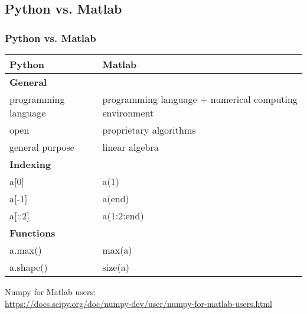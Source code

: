 \subsection{Python vs. Matlab}

\begin{frame}[fragile]
\frametitle{Python vs. Matlab}
\footnotesize

\begin{table}
\scriptsize
\begin{tabular}{p{}p{}}
\toprule
Python  	  				& Matlab\\
\midrule
\textbf{General}			& \\
programming language		& programming language + numerical computing environment\\
open						& proprietary algorithms\\
general purpose				& linear algebra\\
\midrule
\textbf{Indexing} 			& 	\\
a[0]						& a(1) \\
a[-1]						& a(end)\\
a[::2]						& a(1:2:end)\\
\midrule
\textbf{Functions}			& \\
a.max()						& max(a)\\
a.shape()					& size(a)\\
\bottomrule
\end{tabular}
\end{table}

\vfill

Numpy for Matlab users:\\
\url{https://docs.scipy.org/doc/numpy-dev/user/numpy-for-matlab-users.html}

\end{frame}


